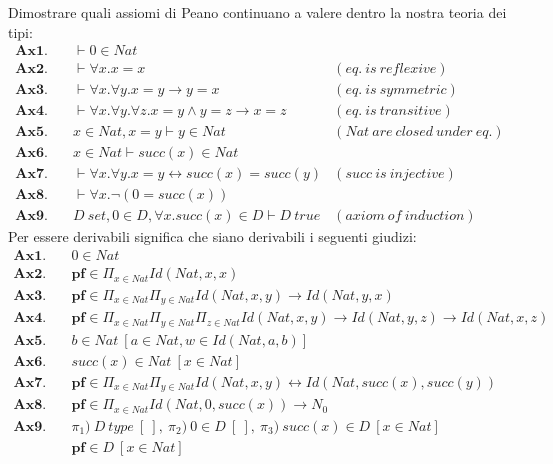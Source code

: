 Dimostrare quali assiomi di Peano continuano a valere dentro la nostra teoria dei tipi:
\begin{align*}
    \textbf{Ax1}.&\quad \vdash 0 \in Nat&\\
    \textbf{Ax2}.&\quad \vdash \forall x. x = x& (eq.\ is\ reflexive)\\
    \textbf{Ax3}.&\quad \vdash \forall x. \forall y. x = y \rightarrow y = x& (eq.\ is\ symmetric)\\
    \textbf{Ax4}.&\quad \vdash \forall x. \forall y. \forall z. x = y \wedge y = z \rightarrow x = z& (eq.\ is\ transitive)\\
    \textbf{Ax5}.&\quad x \in Nat, x = y \vdash y \in Nat& (Nat\ are\ closed\ under\ eq.)\\
    \textbf{Ax6}.&\quad x \in Nat \vdash succ(x) \in Nat&\\
    \textbf{Ax7}.&\quad \vdash \forall x. \forall y. x = y \leftrightarrow succ(x) = succ(y)& (succ\ is\ injective)\\
    \textbf{Ax8}.&\quad \vdash \forall x. \neg(0 = succ(x))&\\
    \textbf{Ax9}.&\quad D\ set, 0 \in D, \forall x.succ(x) \in D \vdash D\ true & (axiom\ of\ induction)
\end{align*}
Per essere derivabili significa che siano derivabili i seguenti giudizi:
\begin{align*}
    \textbf{Ax1}.&\quad 0 \in Nat&\\
    \textbf{Ax2}.&\quad \textbf{pf} \in \Pi_{x \in Nat} Id(Nat, x, x)&\\
    \textbf{Ax3}.&\quad \textbf{pf} \in \Pi_{x \in Nat} \Pi_{y \in Nat} Id(Nat, x, y) \rightarrow Id(Nat, y, x)&\\
    \textbf{Ax4}.&\quad \textbf{pf} \in \Pi_{x \in Nat} \Pi_{y \in Nat} \Pi_{z \in Nat} Id(Nat, x, y) \rightarrow Id(Nat, y, z) \rightarrow Id(Nat, x, z)&\\
    \textbf{Ax5}.&\quad b \in Nat\ [a \in Nat, w \in Id(Nat, a, b)]&\\
    \textbf{Ax6}.&\quad succ(x) \in Nat\ [x \in Nat]&\\
    \textbf{Ax7}.&\quad \textbf{pf} \in \Pi_{x \in Nat} \Pi_{y \in Nat} Id(Nat, x, y) \leftrightarrow Id(Nat, succ(x), succ(y))&\\
    \textbf{Ax8}.&\quad \textbf{pf} \in \Pi_{x \in Nat} Id(Nat, 0, succ(x)) \rightarrow N_0&\\
    \textbf{Ax9}.&\quad \pi_1)\ D\ type\ [\ ],\ \pi_2)\ 0 \in D\ [\ ],\ \pi_3)\ succ(x) \in D\ [x \in Nat]\\
        &\quad \textbf{pf} \in D\ [x \in Nat]
\end{align*}